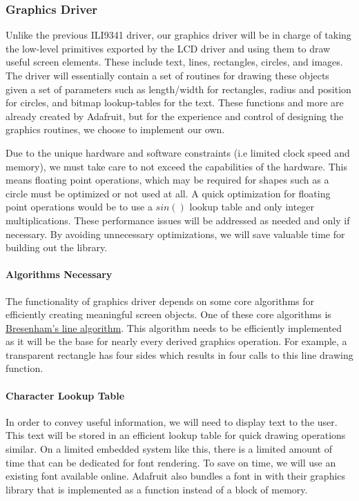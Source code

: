 
\subsubsection{Graphics Driver}
Unlike the previous ILI9341 driver, our graphics driver will be in charge of
taking the low-level primitives exported by the LCD driver and using them to
draw useful screen elements. These include text, lines, rectangles, circles,
and images. The driver will essentially contain a set of routines for drawing
these objects given a set of parameters such as length/width for rectangles,
radius and position for circles, and bitmap lookup-tables for the text. These
functions and more are already created by Adafruit, but for the experience and
control of designing the graphics routines, we choose to implement our own.

Due to the unique hardware and software constraints (i.e limited clock speed
and memory), we must take care to not exceed the capabilities of the hardware.
This means floating point operations, which may be required for shapes such as
a circle must be optimized or not used at all. A quick optimization for
floating point operations would be to use a $sin()$ lookup table and only
integer multiplications. These performance issues will be addressed as needed
and only if necessary. By avoiding unnecessary optimizations, we will save
valuable time for building out the library.

\paragraph{Algorithms Necessary}
The functionality of graphics driver depends on some core algorithms for
efficiently creating meaningful screen objects. One of these core algorithms is
\href{https://en.wikipedia.org/wiki/Bresenham\%27s_line_algorithm}{Bresenham's
line algorithm}. This algorithm needs to be efficiently implemented as it will
be the base for nearly every derived graphics operation. For example, a
transparent rectangle has four sides which results in four calls to this line
drawing function.

\paragraph{Character Lookup Table}
In order to convey useful information, we will need to display text to the
user. This text will be stored in an efficient lookup table for quick drawing
operations similar. On a limited embedded
system like this, there is a limited amount of time that can be dedicated for
font rendering. To save on time, we will use an existing font available online.
Adafruit also bundles a font in with their graphics library that is implemented
as a function instead of a block of memory.


